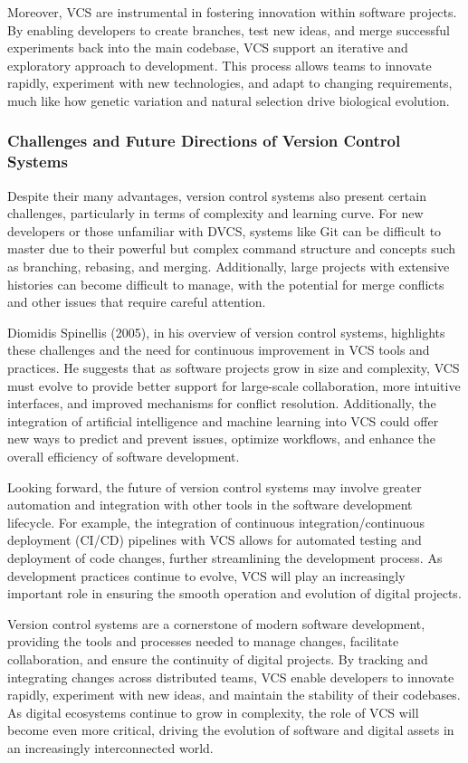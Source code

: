 \documentclass[12pt,twoside]{article}
\begin{document}
Moreover, VCS are instrumental in fostering innovation within software projects. By enabling developers to create branches, test new ideas, and merge successful experiments back into the main codebase, VCS support an iterative and exploratory approach to development. This process allows teams to innovate rapidly, experiment with new technologies, and adapt to changing requirements, much like how genetic variation and natural selection drive biological evolution.


\subsubsection{Challenges and Future Directions of Version Control Systems}

Despite their many advantages, version control systems also present certain challenges, particularly in terms of complexity and learning curve. For new developers or those unfamiliar with DVCS, systems like Git can be difficult to master due to their powerful but complex command structure and concepts such as branching, rebasing, and merging. Additionally, large projects with extensive histories can become difficult to manage, with the potential for merge conflicts and other issues that require careful attention.

Diomidis Spinellis (2005), in his overview of version control systems, highlights these challenges and the need for continuous improvement in VCS tools and practices. He suggests that as software projects grow in size and complexity, VCS must evolve to provide better support for large-scale collaboration, more intuitive interfaces, and improved mechanisms for conflict resolution. Additionally, the integration of artificial intelligence and machine learning into VCS could offer new ways to predict and prevent issues, optimize workflows, and enhance the overall efficiency of software development.

Looking forward, the future of version control systems may involve greater automation and integration with other tools in the software development lifecycle. For example, the integration of continuous integration/continuous deployment (CI/CD) pipelines with VCS allows for automated testing and deployment of code changes, further streamlining the development process. As development practices continue to evolve, VCS will play an increasingly important role in ensuring the smooth operation and evolution of digital projects.

Version control systems are a cornerstone of modern software development, providing the tools and processes needed to manage changes, facilitate collaboration, and ensure the continuity of digital projects. By tracking and integrating changes across distributed teams, VCS enable developers to innovate rapidly, experiment with new ideas, and maintain the stability of their codebases. As digital ecosystems continue to grow in complexity, the role of VCS will become even more critical, driving the evolution of software and digital assets in an increasingly interconnected world.
\end{document}
